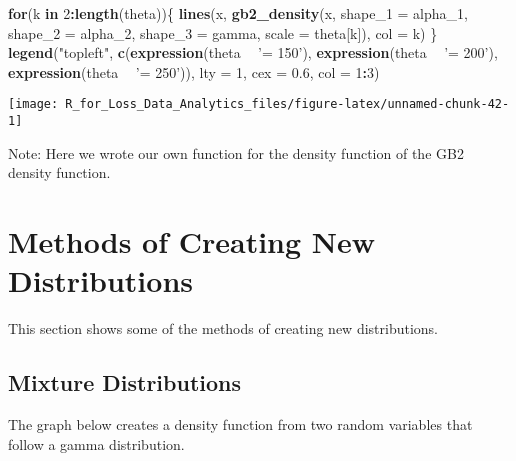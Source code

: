 \documentclass[]{book}
\newenvironment{Shaded}{\begin{snugshade}}{\end{snugshade}}
\newcommand{\KeywordTok}[1]{\textcolor[rgb]{0.13,0.29,0.53}{\textbf{#1}}}
\newcommand{\DataTypeTok}[1]{\textcolor[rgb]{0.13,0.29,0.53}{#1}}
\newcommand{\DecValTok}[1]{\textcolor[rgb]{0.00,0.00,0.81}{#1}}
\newcommand{\FloatTok}[1]{\textcolor[rgb]{0.00,0.00,0.81}{#1}}
\newcommand{\StringTok}[1]{\textcolor[rgb]{0.31,0.60,0.02}{#1}}
\newcommand{\ControlFlowTok}[1]{\textcolor[rgb]{0.13,0.29,0.53}{\textbf{#1}}}
\newcommand{\OperatorTok}[1]{\textcolor[rgb]{0.81,0.36,0.00}{\textbf{#1}}}
\newcommand{\NormalTok}[1]{#1}
\theoremstyle{definition}
\theoremstyle{definition}
\theoremstyle{definition}
\theoremstyle{remark}
\begin{document}
\begin{Shaded}
\begin{Highlighting}[]
\ControlFlowTok{for}\NormalTok{(k }\ControlFlowTok{in} \DecValTok{2}\OperatorTok{:}\KeywordTok{length}\NormalTok{(theta))\{}
  \KeywordTok{lines}\NormalTok{(x, }\KeywordTok{gb2_density}\NormalTok{(x, }\DataTypeTok{shape_1 =}\NormalTok{ alpha_}\DecValTok{1}\NormalTok{, }\DataTypeTok{shape_2 =}\NormalTok{ alpha_}\DecValTok{2}\NormalTok{, }\DataTypeTok{shape_3 =}\NormalTok{ gamma, }
                       \DataTypeTok{scale =}\NormalTok{ theta[k]), }\DataTypeTok{col =}\NormalTok{ k)}
\NormalTok{\}}
\KeywordTok{legend}\NormalTok{(}\StringTok{"topleft"}\NormalTok{, }\KeywordTok{c}\NormalTok{(}\KeywordTok{expression}\NormalTok{(theta }\OperatorTok{~}\StringTok{ '= 150'}\NormalTok{), }\KeywordTok{expression}\NormalTok{(theta }\OperatorTok{~}\StringTok{ '= 200'}\NormalTok{), }
                    \KeywordTok{expression}\NormalTok{(theta }\OperatorTok{~}\StringTok{ '= 250'}\NormalTok{)), }\DataTypeTok{lty =} \DecValTok{1}\NormalTok{, }\DataTypeTok{cex =} \FloatTok{0.6}\NormalTok{, }\DataTypeTok{col =} \DecValTok{1}\OperatorTok{:}\DecValTok{3}\NormalTok{)}
\end{Highlighting}
\end{Shaded}

\begin{center}\texttt{[image: R\_for\_Loss\_Data\_Analytics\_files/figure-latex/unnamed-chunk-42-1]} \end{center}

Note: Here we wrote our own function for the density function of the GB2
density function.

\section{Methods of Creating New
Distributions}\label{methods-of-creating-new-distributions}

This section shows some of the methods of creating new distributions.

\subsection{Mixture Distributions}\label{mixture-distributions}

The graph below creates a density function from two random variables
that follow a gamma distribution.
\end{document}
